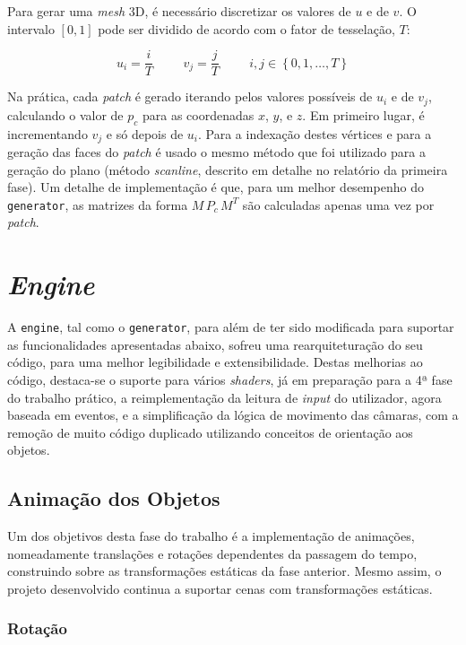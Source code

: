 \documentclass[12pt, a4paper]{article}
\begin{document}
Para gerar uma \emph{mesh} 3D, é necessário discretizar os valores de $u$ e de $v$. O intervalo
$\left [ 0, 1 \right ]$ pode ser dividido de acordo com o fator de tesselação, $T$:

$$
u_i = \frac{i}{T}
\hspace{1cm}
v_j = \frac{j}{T}
\hspace{1cm}
i, j \in \left \lbrace 0, 1, \ldots, T \right \rbrace
$$

Na prática, cada \emph{patch} é gerado iterando pelos valores possíveis de $u_i$ e de $v_j$,
calculando o valor de $p_c$ para as coordenadas $x$, $y$, e $z$. Em primeiro lugar, é incrementando
$v_j$ e só depois de $u_i$. Para a indexação destes vértices e para a geração das faces do
\emph{patch} é usado o mesmo método que foi utilizado para a geração do plano (método
\emph{scanline}, descrito em detalhe no relatório da primeira fase). Um detalhe de implementação é
que, para um melhor desempenho do \texttt{generator}, as matrizes da forma $M \, P_c \, M^T$ são
calculadas apenas uma vez por \emph{patch}.

\section{\emph{Engine}}

A \texttt{engine}, tal como o \texttt{generator}, para além de ter sido modificada para suportar as
funcionalidades apresentadas abaixo, sofreu uma rearquiteturação do seu código, para uma melhor
legibilidade e extensibilidade. Destas melhorias ao código, destaca-se o suporte para vários
\emph{shaders}, já em preparação para a 4ª fase do trabalho prático, a reimplementação da leitura de
\emph{input} do utilizador, agora baseada em eventos, e a simplificação da lógica de movimento das
câmaras, com a remoção de muito código duplicado utilizando conceitos de orientação aos objetos.

\subsection{Animação dos Objetos}

Um dos objetivos desta fase do trabalho é a implementação de animações, nomeadamente translações e
rotações dependentes da passagem do tempo, construindo sobre as transformações estáticas da fase
anterior. Mesmo assim, o projeto desenvolvido continua a suportar cenas com transformações
estáticas.

\subsubsection{Rotação}
\end{document}
